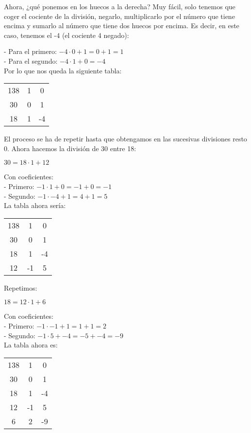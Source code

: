 \documentclass[11pt, a4paper, titlepage]{article}
\begin{document}
Ahora, ¿qué ponemos en los huecos a la derecha? Muy fácil, solo tenemos que coger el cociente de la división, negarlo, multiplicarlo por el número que tiene encima y sumarlo al número que tiene dos huecos por encima. Es decir, en este caso, tenemos el -4 (el cociente 4 negado):

- Para el primero: $ -4 \cdot 0 + 1 = 0 + 1 = 1 $ \\
- Para el segundo: $ -4 \cdot 1 + 0 = -4 $ \\

Por lo que nos queda la siguiente tabla:


\begin{center}
\begin{tabular}{c|cc}
138 & 1 & 0 \\
30 & 0 & 1 \\
\hline
18 & 1 & -4 \\
\end{tabular}
\end{center}

El proceso se ha de repetir hasta que obtengamos en las sucesivas divisiones resto 0. Ahora hacemos la
división de 30 entre 18:

$ 30 = 18 \cdot 1 + 12 $

Con coeficientes: \\
- Primero: $ -1 \cdot 1 + 0 = -1 + 0 = -1 $ \\
- Segundo: $ -1 \cdot -4 + 1 = 4 + 1 = 5 $ \\

La tabla ahora sería:

\begin{center}
\begin{tabular}{c|cc}
138 & 1 & 0 \\
30 & 0 & 1 \\
\hline
18 & 1 & -4 \\
\hline
12 & -1 & 5
\end{tabular}
\end{center}


Repetimos:

$ 18 = 12 \cdot 1 + 6 $

Con coeficientes: \\
- Primero: $ -1 \cdot -1 + 1 = 1 + 1 = 2 $ \\
- Segundo: $ -1 \cdot 5 + -4 = -5 + -4 = -9 $ \\

La tabla ahora es:

\begin{center}
\begin{tabular}{c|cc}
138 & 1 & 0 \\
30 & 0 & 1 \\
\hline
18 & 1 & -4 \\
\hline
12 & -1 & 5 \\
\hline
6 & 2 & -9 \\
\end{tabular}
\end{center}
\end{document}
